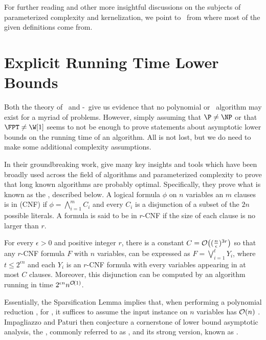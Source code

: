 For further reading and other more insightful discussions on the subjects of parameterized complexity and kernelization, we point to~\citep{downey_fellows, cygan_parameterized, book-kernels} from where most of the given definitions come from. 

\section{Explicit Running Time Lower Bounds}

Both the theory of \NPcness\ and \W[1]-\Hness\ give us evidence that no polynomial or \FPT\ algorithm may exist for a myriad of problems.
However, simply assuming that $\P \neq \NP$ or that $\FPT \neq \W[1]$ seems to not be enough to prove statements about asymptotic lower bounds on the running time of an algorithm.
All is not lost, but we do need to make some additional complexity assumptions.

In their groundbreaking work, \cite{eth} give many key insights and tools which have been broadly used across the field of algorithms and parameterized complexity to prove that long known algorithms are probably optimal.
Specifically, they prove what is known as the , described below.
A logical formula $\phi$ on $n$ variables an $m$ clauses is in  (CNF) if $\phi = \bigwedge_{i=1}^m C_i$ and every $C_i$ is a disjunction of a subset of the $2n$ possible literals.
A formula is said to be in $r$-CNF if the size of each clause is no larger than $r$.

\begin{class_definition*}
    For every $\epsilon > 0$ and positive
    integer $r$, there is a constant $C = \mathcal{O}\!\left((\frac{n}{\epsilon})^{3r}\right)$ so that any $r$-CNF formula $F$ with $n$ variables, can be expressed as $F = \bigvee_{i=1}^t Y_i$, where $t \leq 2^{\epsilon n}$ and each $Y_i$ is an $r$-CNF formula with every variables appearing in at most $C$ clauses.
    Moreover, this disjunction can be computed by an algorithm running in time $2^{\epsilon n}n^{\mathcal{O}\!\left(1\right)}$.
\end{class_definition*}

Essentially, the Sparsification Lemma implies that, when performing a polynomial reduction , for , it suffices to assume the input instance on $n$ variables has $\mathcal{O}\!\left(n\right)$ .
Impagliazzo and Paturi then conjecture a cornerstone of lower bound asymptotic analysis, the , commonly referred to as \ETH, and its strong version, known as \SETH.

